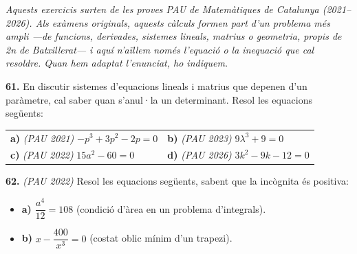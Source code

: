 \documentclass[13pt,a4paper]{extarticle}
\begin{document}
\par\noindent\begin{minipage}{\linewidth}
\emph{\small Aquests exercicis surten de les proves PAU de Matemàtiques de Catalunya (2021–2026). Als exàmens originals, aquests càlculs formen part d'un problema més ampli —de funcions, derivades, sistemes lineals, matrius o geometria, propis de 2n de Batxillerat— i aquí n'aïllem només l'equació o la inequació que cal resoldre. Quan hem adaptat l'enunciat, ho indiquem.}\par
\end{minipage}\par\vspace{1.6mm}
\par\noindent\begin{minipage}{\linewidth}
\textbf{61.} En discutir sistemes d'equacions lineals i matrius que depenen d'un paràmetre, cal saber quan s'anul·la un determinant. Resol les equacions següents:\par


\begin{tabular}{@{}p{.46\linewidth}p{.46\linewidth}@{}}
\textbf{a)} \emph{(PAU 2021)} $-p^3+3p^2-2p=0$ & \textbf{b)} \emph{(PAU 2023)} $9\lambda^3+9=0$ \\[3pt]
\textbf{c)} \emph{(PAU 2022)} $15a^2-60=0$ & \textbf{d)} \emph{(PAU 2026)} $3k^2-9k-12=0$ \\[3pt]
\end{tabular}\par
\end{minipage}\par\vspace{1.6mm}
\par\noindent\begin{minipage}{\linewidth}
\textbf{62.} \emph{(PAU 2022)} Resol les equacions següents, sabent que la incògnita és positiva:\par

\begin{itemize}[leftmargin=0pt,itemsep=6pt,topsep=4pt,parsep=0pt,label={}]
\item \textbf{a)} $\dfrac{a^4}{12}=108$ (condició d'àrea en un problema d'integrals).
\item \textbf{b)} $x-\dfrac{400}{x^3}=0$ (costat oblic mínim d'un trapezi).
\end{itemize}
\end{minipage}\par\vspace{1.6mm}
\end{document}
